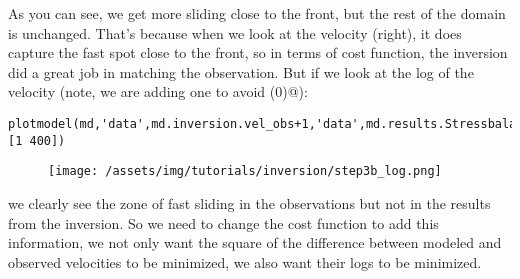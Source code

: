 As you can see, we get more sliding close to the front, but the rest of the domain is unchanged. That's because when we look at the velocity (right), it does capture the fast spot close to the front, so in terms of cost function, the inversion did a great job in matching the observation. But if we look at the log of the velocity (note, we are adding one to avoid \verb@log(0)@):
\begin{verbatim}plotmodel(md,'data',md.inversion.vel_obs+1,'data',md.results.StressbalanceSolution.Vel+1,'log#all',10,'caxis#all',[1 400])
\end{verbatim}
\begin{figure}[H]
	\begin{center}
		\texttt{[image: /assets/img/tutorials/inversion/step3b\_log.png]}
	\end{center}
\end{figure}
we clearly see the zone of fast sliding in the observations but not in the results from the inversion. So we need to change the cost function to add this information, we not only want the square of the difference between modeled and observed velocities to be minimized, we also want their logs to be minimized.

